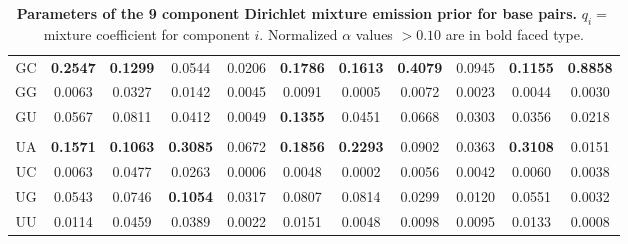 \documentclass[11pt]{article}
\begin{document}
\begin{table}
\begin{center}
\begin{tabular}{|c|c|c|c|c|c|c|c|c|c|c|}
GC & \textbf{0.2547} & \textbf{0.1299} & 0.0544 & 0.0206 & \textbf{0.1786} & \textbf{0.1613} & \textbf{0.4079} & 0.0945 & \textbf{0.1155} & \textbf{0.8858} \\  
GG & 0.0063 & 0.0327 & 0.0142 & 0.0045 & 0.0091 & 0.0005 & 0.0072 & 0.0023 & 0.0044 & 0.0030 \\  
GU & 0.0567 & 0.0811 & 0.0412 & 0.0049 & \textbf{0.1355} & 0.0451 & 0.0668 & 0.0303 & 0.0356 & 0.0218 \\  
& & & & & & & & & & \\
UA & \textbf{0.1571} & \textbf{0.1063} & \textbf{0.3085} & 0.0672 & \textbf{0.1856} & \textbf{0.2293} & 0.0902 & 0.0363 & \textbf{0.3108} & 0.0151 \\  
UC & 0.0063 & 0.0477 & 0.0263 & 0.0006 & 0.0048 & 0.0002 & 0.0056 & 0.0042 & 0.0060 & 0.0038 \\  
UG & 0.0543 & 0.0746 & \textbf{0.1054} & 0.0317 & 0.0807 & 0.0814 & 0.0299 & 0.0120 & 0.0551 & 0.0032 \\  
UU & 0.0114 & 0.0459 & 0.0389 & 0.0022 & 0.0151 & 0.0048 & 0.0098 & 0.0095 & 0.0133 & 0.0008 \\ \hline 
\end{tabular}
\end{center}

\normalfont\rmfamily
\caption{\textbf{Parameters of the 9 component Dirichlet mixture
    emission prior for base pairs.} $q_i =$ mixture coefficient for
    component $i$. Normalized $\alpha$ values $> 0.10$ are in bold
    faced type.}
\label{tbl:basepairs}
\end{table}
\end{document}
